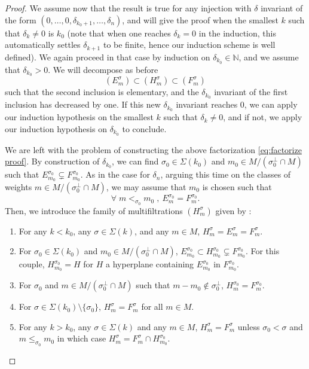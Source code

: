 \documentclass[a4paper,10pt]{amsart}
\theoremstyle{plain}{
    \newtheorem{theorem}{Theorem}[section]
    \newtheorem{lemma}[theorem]{Lemma}
    \newtheorem{corollary}[theorem]{Corollary}
    \newtheorem{proposition}[theorem]{Proposition}
    \newtheorem{conjecture}[theorem]{Conjecture}
}
\theoremstyle{definition}{
    \newtheorem{definition}[theorem]{Definition}
    \newtheorem{defn-thm}[theorem]{Definition-Theorem}
    \newtheorem{example}[theorem]{Example}
    \newtheorem{notation}[theorem]{Notation}
}
\theoremstyle{remark}{
    \newtheorem{remark}[theorem]{Remark}
    \newtheorem{problem}[theorem]{Problem}
    \newtheorem{question}[theorem]{Question}
}
\def\N{\mathbb{N}}
\begin{document}
\begin{proof}
We assume now that the result is true for any injection with $\delta$ invariant of the form $(0,\ldots,0,\delta_{k_0+1},\ldots,\delta_n)$, and will give the proof when the smallest $k$ such that $\delta_k\neq 0$ is $k_0$ (note that when one reaches $\delta_k=0$ in the induction, this automatically settles $\delta_{k+1}$ to be finite, hence our induction scheme is well defined). We again proceed in that case by induction on $\delta_{k_0}\in\N$, and we assume that $\delta_{k_0}>0$. We will decompose as before
\begin{equation}
 \label{eq:factorize proof}
(E_m^\sigma)\subset (H_m^\sigma)\subset (F_m^\sigma)
\end{equation}
such that the second inclusion is elementary, and the $\delta_{k_0}$ invariant of the first inclusion has decreased by one. If this new $\delta_{k_0}$ invariant reaches $0$, we can apply our induction hypothesis on the smallest $k$ such that $\delta_k\neq 0$, and if not, we apply our induction hypothesis on $\delta_{k_0}$ to conclude.

We are left with the problem of constructing the above factorization \eqref{eq:factorize proof}. By construction of $\delta_{k_0}$, we can find $\sigma_0\in\Sigma(k_0)$ and $m_0\in M/(\sigma_0^\perp\cap M)$ such that $E^{\sigma_0}_{m_0}\subsetneq F^{\sigma_0}_{m_0}$. As in the case for $\delta_n$, arguing this time on the classes of weights $m\in M/(\sigma_0^\perp\cap M)$, we may assume that $m_0$ is chosen such that
\begin{equation}
 \label{eq:choice m0 for H}
\forall\; m<_{\sigma_0} m_0\;,\: E^{\sigma_0}_{m}= F^{\sigma_0}_{m}. 
\end{equation}
Then, we introduce the family of multifiltrations $(H_m^\sigma)$ given by :
 \begin{enumerate}
  \item[$(H1)$] For any $k<k_0$, any $\sigma\in\Sigma(k)$, and any $m\in M$, $H^\sigma_m=E^\sigma_m=F^\sigma_m$.
  \item[$(H2)$] For $\sigma_0\in\Sigma(k_0)$ and $m_0\in M/(\sigma_0^\perp\cap M)$, $E^{\sigma_0}_{m_0}\subset H^{\sigma_0}_{m_0}\subsetneq F^{\sigma_0}_{m_0}$. For this couple, $H^{\sigma_0}_{m_0}=H$ for $H$ a hyperplane containing $E^{\sigma_0}_{m_0}$ in $F^{\sigma_0}_{m_0}$.
  \item[$(H3)$] For $\sigma_0$ and $m\in M/(\sigma_0^\perp\cap M)$ such that $m- m_0\notin \sigma_0^\perp$, $H_m^{\sigma_0}=F_m^{\sigma_0}$.
  \item[$(H4)$] For $\sigma\in\Sigma(k_0)\setminus\lbrace \sigma_0\rbrace$,  $H^\sigma_m=F^\sigma_m$ for all $m\in M$. 
  \item[$(H5)$] For any $k>k_0$, any $\sigma\in\Sigma(k)$ and any $m\in M$, $H^\sigma_m=F^\sigma_m$ unless $\sigma_0<\sigma$ and $m\leq_{\sigma_0} m_0$ in which case $H^\sigma_m=F^\sigma_m\cap H^{\sigma_0}_{m_0}$.
 \end{enumerate}
 

\end{proof}
\end{document}
